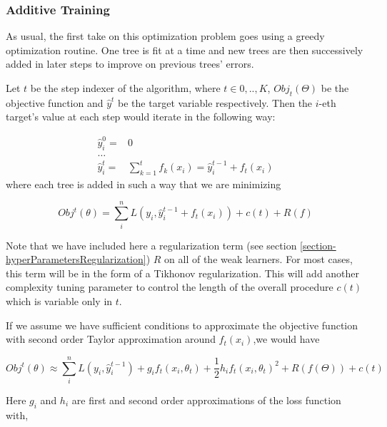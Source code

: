 \subsubsection{Additive Training}

As usual, the first take on this optimization problem goes using a greedy optimization routine. 
One tree is fit at a time and new trees are then successively added in later steps to improve on previous trees' errors.

Let $t$ be the step indexer of the algorithm, where $t \in {0,..,K}$, $Obj_t(\Theta)$ be the objective function and $\hat{y}^t$ be the target variable respectively. 
Then the $i$-eth target's value at each step would iterate in the following way:

\begin{equation}\label{eq:gb-targetSteps}
\begin{split}
\hat{y}_i^0 = & 0 \\
\ldots \\
\hat{y}_i^t = &\sum_{k=1}^{t} f_k(x_i) = \hat{y}^{t-1}_i + f_t(x_i)
\end{split}
\end{equation}
where each tree is added in such a way that we are minimizing

\begin{equation}
Obj^t(\theta) = \sum_i^n L(y_i, \hat{y}^{t-1}_i + f_t(x_i) ) + c(t) + R(f)
\end{equation}


Note that we have included here a regularization term (see section \cref{section-hyperParametersRegularization}) $R$ on all of the weak learners. 
For most cases, this term will be in the form of a Tikhonov regularization. 
This will add another complexity tuning parameter to control the length of the overall procedure $c(t)$ which is variable only in $t$.

If we assume we have sufficient conditions to approximate the objective function with second order Taylor approximation around $f_t(x_i)$,we would have

\begin{equation}\label{eq:gradientBoostingTaylor}
Obj^t(\theta) \approx \sum_i^n {L(y_i, \hat{y}^{t-1}_i) + g_i f_t(x_i,\theta_t) + \frac{1}{2} h_i {f_t(x_i,\theta_t)}^2 } + R(f(\Theta)) + c(t)
\end{equation}

Here $g_i$ and $h_i$ are first and second order approximations of the loss function with,

